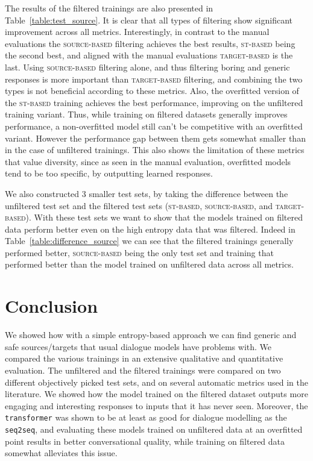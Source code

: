 \documentclass[11pt,a4paper]{article}
\begin{document}
The results of the filtered trainings are also presented in Table~\ref{table:test_source}. It is clear that all types of filtering show significant improvement across all metrics. Interestingly, in contrast to the manual evaluations the \textsc{source-based} filtering achieves the best results, \textsc{st-based} being the second best, and aligned with the manual evaluations \textsc{target-based} is the last. Using \textsc{source-based} filtering alone, and thus filtering boring and generic responses is more important than \textsc{target-based} filtering, and combining the two types is not beneficial according to these metrics. Also, the overfitted version of the \textsc{st-based} training achieves the best performance, improving on the unfiltered training variant. Thus, while training on filtered datasets generally improves performance, a non-overfitted model still can't be competitive with an overfitted variant. However the performance gap between them gets somewhat smaller than in the case of unfiltered trainings. This also shows the limitation of these metrics that value diversity, since as seen in the manual evaluation, overfitted models tend to be too specific, by outputting learned responses.

We also constructed 3 smaller test sets, by taking the difference between the unfiltered test set and the filtered test sets (\textsc{st-based}, \textsc{source-based}, and \textsc{target-based}). With these test sets we want to show that the models trained on filtered data perform better even on the high entropy data that was filtered. Indeed in Table~\ref{table:difference_source} we can see that the filtered trainings generally performed better, \textsc{source-based} being the only test set and training that performed better than the model trained on unfiltered data across all metrics.


\section{Conclusion}
\label{sec:conclusion}
We showed how with a simple entropy-based approach we can find generic and
safe sources/targets that usual dialogue models have problems with. We
compared the various trainings in an extensive qualitative and quantitative
evaluation. The unfiltered and the
filtered trainings were compared on two different objectively picked test sets, and on several automatic metrics used in the literature. We showed
how the model trained on the filtered dataset outputs more engaging and
interesting responses to inputs that it has never seen. Moreover, the \texttt{transformer} was shown to be at least as good for dialogue modelling as the \texttt{seq2seq}, and evaluating these models trained on unfiltered data at an overfitted point results in better conversational quality, while training on filtered data somewhat alleviates this issue.
\end{document}
